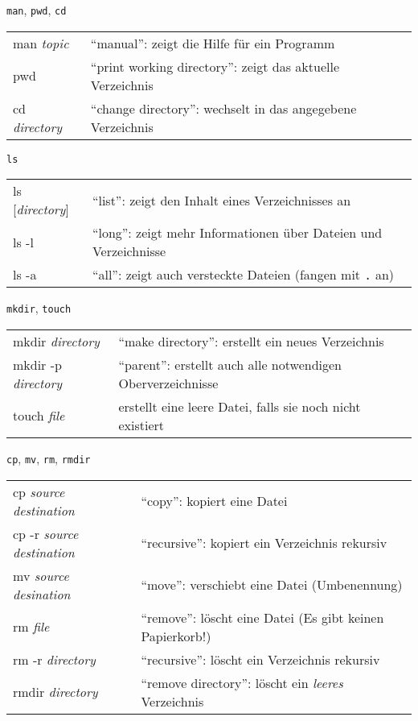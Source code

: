 \begin{frame}{\texttt{man}, \texttt{pwd}, \texttt{cd}}
  \begin{tabu}{>{\ttfamily}l X[,L]}
    man \textit{topic}    & \enquote{manual}: zeigt die Hilfe für ein Programm \\
    pwd                   & \enquote{print working directory}: zeigt das aktuelle Verzeichnis \\
    cd \textit{directory} & \enquote{change directory}: wechselt in das angegebene Verzeichnis
  \end{tabu}
\end{frame}

\begin{frame}{\texttt{ls}}
  \begin{tabu}{>{\ttfamily}l X[,L]}
    ls [\textit{directory}] & \enquote{list}: zeigt den Inhalt eines Verzeichnisses an \\
    ls -l                   & \enquote{long}: zeigt mehr Informationen über Dateien und Verzeichnisse \\
    ls -a                   & \enquote{all}: zeigt auch versteckte Dateien (fangen mit \texttt{.} an)
  \end{tabu}
\end{frame}

\begin{frame}{\texttt{mkdir}, \texttt{touch}}
  \begin{tabu}{>{\ttfamily}l X[,L]}
    mkdir \textit{directory}    & \enquote{make directory}: erstellt ein neues Verzeichnis \\
    mkdir -p \textit{directory} & \enquote{parent}: erstellt auch alle notwendigen Oberverzeichnisse \\
    touch \textit{file}         & erstellt eine leere Datei, falls sie noch nicht existiert
  \end{tabu}
\end{frame}

\begin{frame}{\texttt{cp}, \texttt{mv}, \texttt{rm}, \texttt{rmdir}}
  \begin{tabu}{>{\ttfamily}l X[,L]}
    cp \textit{source} \textit{destination}    & \enquote{copy}: kopiert eine Datei \\
    cp -r \textit{source} \textit{destination} & \enquote{recursive}: kopiert ein Verzeichnis rekursiv \\
    mv \textit{source} \textit{desination}     & \enquote{move}: verschiebt eine Datei (Umbenennung) \\
    rm \textit{file}                           & \enquote{remove}: löscht eine Datei (Es gibt keinen Papierkorb!) \\
    rm -r \textit{directory}                   & \enquote{recursive}: löscht ein Verzeichnis rekursiv \\
    rmdir \textit{directory}                   & \enquote{remove directory}: löscht ein \emph{leeres} Verzeichnis
  \end{tabu}
\end{frame}

